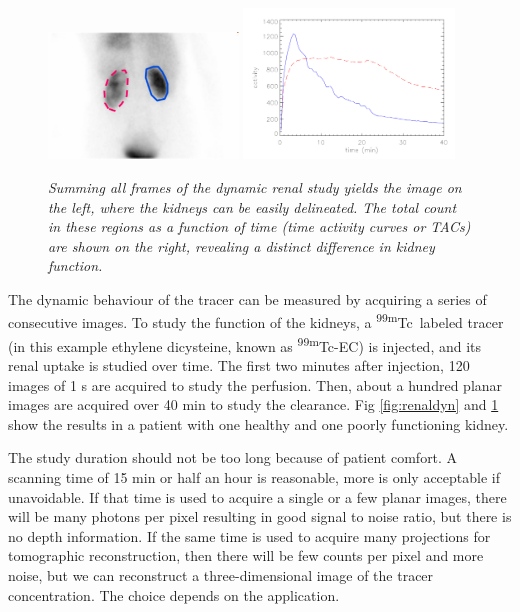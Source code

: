 \documentclass[11pt,oneside]{book}
\begin{document}
\begin{figure}[tb]
\centering
\includegraphics[width=0.45\textwidth]{figs/fig_renalrois.pdf}
  \includegraphics[width=0.5\textwidth]{figs/fig_renalplot.pdf}
\caption{\label{fig:renalroi} \emph{Summing all frames of the dynamic
    renal study yields the image on the left, where the kidneys can be
    easily delineated. The total count in these regions as a function
    of time (time activity curves or TACs) are shown on the right,
    revealing a distinct difference in kidney function.}}
\end{figure}

The dynamic behaviour of the tracer can be measured by acquiring a
series of consecutive images. To study the function of the kidneys, a
\textsuperscript{99m}Tc\ labeled tracer (in this example ethylene dicysteine, known
as \textsuperscript{99m}Tc-EC) is injected, and its renal uptake is studied over
time. The first two minutes after injection, 120 images of 1 s are
acquired to study the perfusion. Then, about a hundred planar images
are acquired over 40 min to study the clearance. Fig
\ref{fig:renaldyn} and \ref{fig:renalroi} show the results in a
patient with one healthy and one poorly functioning kidney.

The study duration should not be too long because of patient
comfort. A scanning time of 15 min or half an hour is reasonable, more
is only acceptable if unavoidable. If that time is used to acquire a
single or a few planar images, there will be many photons per pixel
resulting in good signal to noise ratio, but there is no depth
information.  If the same time is used to acquire many projections for
tomographic reconstruction, then there will be few counts per pixel
and more noise, but we can reconstruct a three-dimensional image of
the tracer concentration. The choice depends on the application.
\end{document}
